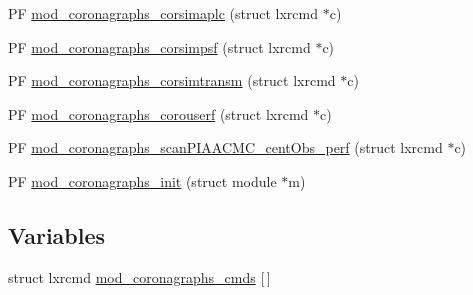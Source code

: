 \begin{DoxyCompactItemize}
\item 
P\+F \hyperlink{src_2coronagraphs_2coronagraphs-util_8c_a1899341d9678aeef845c3e6b93a19665}{mod\+\_\+coronagraphs\+\_\+corsimaplc} (struct lxrcmd $\ast$c)
\item 
P\+F \hyperlink{src_2coronagraphs_2coronagraphs-util_8c_a2c2a5519f28390c6681c02a74ac85c1c}{mod\+\_\+coronagraphs\+\_\+corsimpsf} (struct lxrcmd $\ast$c)
\item 
P\+F \hyperlink{src_2coronagraphs_2coronagraphs-util_8c_a64f8790624a00f66c0909931f9b59fd1}{mod\+\_\+coronagraphs\+\_\+corsimtransm} (struct lxrcmd $\ast$c)
\item 
P\+F \hyperlink{src_2coronagraphs_2coronagraphs-util_8c_abbb1d233077de55b9998a8ecf194f5ba}{mod\+\_\+coronagraphs\+\_\+corouserf} (struct lxrcmd $\ast$c)
\item 
P\+F \hyperlink{src_2coronagraphs_2coronagraphs-util_8c_ad184c4a7b3e1b50678d6dac5953a2a1c}{mod\+\_\+coronagraphs\+\_\+scan\+P\+I\+A\+A\+C\+M\+C\+\_\+cent\+Obs\+\_\+perf} (struct lxrcmd $\ast$c)
\item 
P\+F \hyperlink{src_2coronagraphs_2coronagraphs-util_8c_a72e1df16f2ec59428dbded2069869359}{mod\+\_\+coronagraphs\+\_\+init} (struct module $\ast$m)
\end{DoxyCompactItemize}
\subsection*{Variables}
\begin{DoxyCompactItemize}
\item 
struct lxrcmd \hyperlink{src_2coronagraphs_2coronagraphs-util_8c_a1d7b5c14afe6db43c68aa98a53de63c0}{mod\+\_\+coronagraphs\+\_\+cmds} \mbox{[}$\,$\mbox{]}
\end{DoxyCompactItemize}


